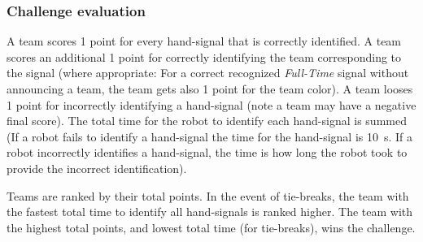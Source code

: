 \subsubsection{Challenge evaluation}
A team scores 1 point for every hand-signal that is correctly identified. A team scores an additional 1 point for correctly identifying the team corresponding to the signal (where appropriate: For a correct recognized \textit{Full-Time} signal without announcing a team, the team gets also 1 point for the team color). A team looses 1 point for incorrectly identifying a hand-signal (note a team may have a negative final score). The total time for the robot to identify each hand-signal is summed (If a robot fails to identify a hand-signal the time for the hand-signal is \qty{10}{\second}. If a robot incorrectly identifies a hand-signal, the time is how long the robot took to provide the incorrect identification).

Teams are ranked by their total points. In the event of tie-breaks, the team with the fastest total time to identify all hand-signals is ranked higher. The team with the highest total points, and lowest total time (for tie-breaks), wins the challenge.